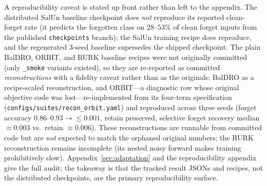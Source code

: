 \documentclass[11pt]{article}
\begin{document}
A reproducibility caveat is stated up front rather than left to the appendix. The distributed SalUn baseline checkpoint does \emph{not} reproduce its reported clean-forget rate (it predicts the forgotten class on $28$--$53\%$ of clean forget inputs from the published \texttt{checkpoints} branch); the SalUn training recipe does reproduce, and the regenerated 3-seed baseline supersedes the shipped checkpoint. The plain BalDRO, ORBIT, and RURK baseline recipes were not originally committed (only \texttt{\_smoke} variants existed), so they are re-reported as committed \emph{reconstructions} with a fidelity caveat rather than as the originals: BalDRO as a recipe-scaled reconstruction, and ORBIT---a diagnostic row whose original objective code was lost---re-implemented from its four-term specification (\texttt{configs/suites/recon\_orbit.yaml}) and reproduced across three seeds (forget accuracy $0.86$--$0.93\!\to\!\le\!0.001$, retain preserved, selective forget recovery median $\approx\!0.003$ vs.\ retain $\approx\!0.006$). These reconstructions are runnable from committed code but are \emph{not} expected to match the orphaned original numbers; the RURK reconstruction remains incomplete (its nested noisy forward makes training prohibitively slow). Appendix~\ref{sec:adaptation} and the reproducibility appendix give the full audit; the takeaway is that the tracked result JSONs and recipes, not the distributed checkpoints, are the primary reproducibility surface.
\end{document}
